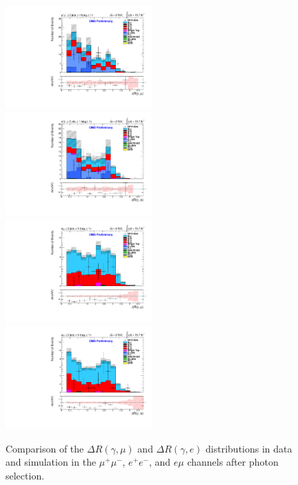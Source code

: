 \documentclass[oneside, a4paper, 11pt, ]{report}
\begin{document}
\begin{figure}
\includegraphics[width=0.5\textwidth]{Plots/ControlPlots/TTbarPhotonAnalysis/MuMu/Photons/SignalPhotons/Photon_deltaR_muons_splitTTbar_ratio.pdf}
\includegraphics[width=0.5\textwidth]{Plots/ControlPlots/TTbarPhotonAnalysis/EE/Photons/SignalPhotons/Photon_deltaR_electrons_splitTTbar_ratio.pdf}\\
\includegraphics[width=0.5\textwidth]{Plots/ControlPlots/TTbarPhotonAnalysis/EMu/Photons/SignalPhotons/Photon_deltaR_muons_splitTTbar_ratio.pdf}
\includegraphics[width=0.5\textwidth]{Plots/ControlPlots/TTbarPhotonAnalysis/EMu/Photons/SignalPhotons/Photon_deltaR_electrons_splitTTbar_ratio.pdf}
\caption{Comparison of the $\Delta R(\gamma, \mu)$ and $\Delta R(\gamma, e)$ distributions in data and simulation in the $\mu^{+}\mu^{-}$, $e^{+}e^{-}$, and $e\mu$ channels after photon selection.}
\label{fig-photonDRmuonsAndDRelectrons}
\end{figure}



%
\end{document}
